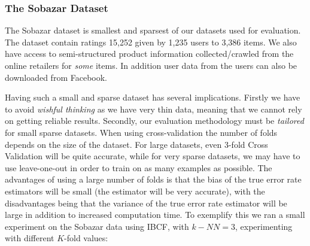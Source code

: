 %

\subsubsection{The Sobazar Dataset}

The Sobazar dataset is smallest and sparsest of our datasets used for evaluation.
The dataset contain ratings 15,252 given by 1,235 users to 3,386 items.
We also have access to semi-structured product information collected/crawled from
the online retailers for \emph{some} items. In addition user data from the users
can also be downloaded from Facebook.

Having such a small and sparse dataset has several implications. Firstly we have
to avoid \emph{wishful thinking} as we have very thin data, meaning that we cannot
rely on getting reliable results. Secondly, our evaluation methodology must be
\emph{tailored} for small sparse datasets. When using cross-validation the number
of folds depends on the size of the dataset. For large datasets, even 3-fold Cross
Validation will be quite accurate, while for very sparse datasets, we may have to
use leave-one-out in order to train on as many examples as possible. The advantages
of using a large number of folds is that the bias of the true error rate estimators
will be small (the estimator will be very accurate), with the disadvantages being that
the variance of the true error rate estimator will be large in addition to increased
computation time. To exemplify this we ran a small experiment on the Sobazar data using
IBCF, with $k-NN=3$, experimenting with different $K$-fold values:

